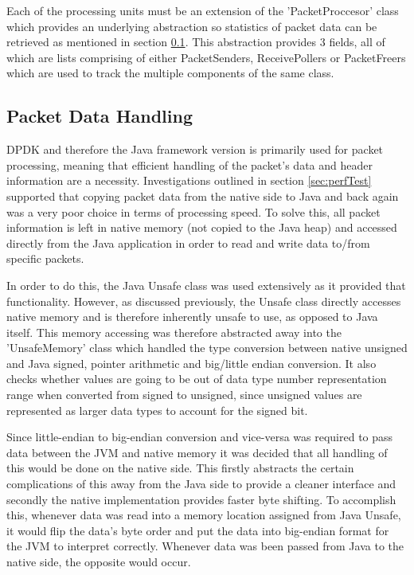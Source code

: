 \documentclass[final_report.tex]{subfiles}
\begin{document}
Each of the processing units must be an extension of the 'PacketProccesor' class which provides an underlying abstraction so statistics of packet data can be retrieved as mentioned in section \ref{subsec:pdh}. This abstraction provides 3 fields, all of which are lists comprising of either PacketSenders, ReceivePollers or PacketFreers which are used to track the multiple components of the same class.

\subsection{Packet Data Handling}
\label{subsec:pdh}
DPDK and therefore the Java framework version is primarily used for packet processing, meaning that efficient handling of the packet's data and header information are a necessity. Investigations outlined in section \ref{sec:perfTest} supported that copying packet data from the native side to Java and back again was a very poor choice in terms of processing speed. To solve this, all packet information is left in native memory (not copied to the Java heap) and accessed directly from the Java application in order to read and write data to/from specific packets.

In order to do this, the Java Unsafe class was used extensively as it provided that functionality. However, as discussed previously, the Unsafe class directly accesses native memory and is therefore inherently unsafe to use, as opposed to Java itself. This memory accessing was therefore abstracted away into the 'UnsafeMemory' class which handled the type conversion between native unsigned and Java signed, pointer arithmetic and big/little endian conversion. It also checks whether values are going to be out of data type number representation range when converted from signed to unsigned, since unsigned values are represented as larger data types to account for the signed bit.

Since little-endian to big-endian conversion and vice-versa was required to pass data between the JVM and native memory it was decided that all handling of this would be done on the native side. This firstly abstracts the certain complications of this away from the Java side to provide a cleaner interface and secondly the native implementation provides faster byte shifting. To accomplish this, whenever data was read into a memory location assigned from Java Unsafe, it would flip the data's byte order and put the data into big-endian format for the JVM to interpret correctly. Whenever data was been passed from Java to the native side, the opposite would occur.
\end{document}
